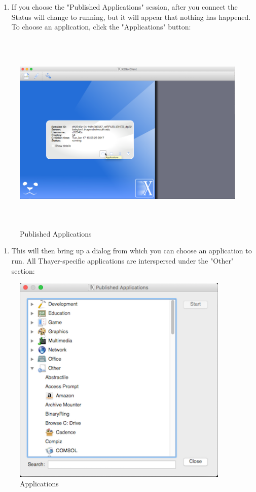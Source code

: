 \begin{enumerate}
	\def\labelenumi{\arabic{enumi}.}
	\setcounter{enumi}{16}
	\item
	If you choose the "Published Applications" session, after you connect
	the Status will change to running, but it will appear that nothing has
	happened. To choose an application, click the "Applications" button:
\end{enumerate}
\begin{figure}
	\centering
	\includegraphics[width=6.26806in,height=3.83718in]{src/images/image11.png}
	\caption{Published Applications}
	\label{fig:fig11}
\end{figure}
\begin{enumerate}
	\def\labelenumi{\arabic{enumi}.}
	\setcounter{enumi}{17}
	\item
	This will then bring up a dialog from which you can choose an
	application to run. All Thayer-specific applications are interspersed
	under the "Other" section:
\end{enumerate}
\begin{figure}
	\centering
	\includegraphics[width=4.07153in,height=3.96413in]{src/images/image12.png}
	\caption{Applications}
	\label{fig:fig12}
\end{figure}
